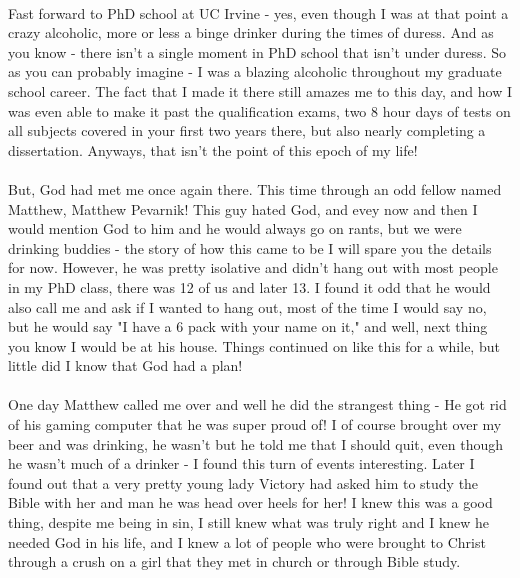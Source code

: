 \documentclass[a4paper]{article}
\begin{document}
\paragraph{}
Fast forward to PhD school at UC Irvine - yes, even though I was at that point a crazy alcoholic, more or
less a binge drinker during the times of duress. And as you know - there isn't a single moment in PhD
school that isn't under duress. So as you can probably imagine - I was a blazing alcoholic throughout my
graduate school career. The fact that I made it there still amazes me to this day, and how I was even able
to make it past the qualification exams, two 8 hour days of tests on all subjects covered in your first two
years there, but also nearly completing a dissertation. Anyways, that isn't the point of this epoch of my life!

\paragraph{}
But, God had met me once again there. This time through an odd fellow named Matthew, Matthew Pevarnik! This
guy hated God, and evey now and then I would mention God to him and he would always go on rants, but we were
drinking buddies - the story of how this came to be I will spare you the details for now. However, he was
pretty isolative and didn't hang out with most people in my PhD class, there was 12 of us and later 13. I
found it odd that he would also call me and ask if I wanted to hang out, most of the time I would say no,
but he would say "I have a 6 pack with your name on it," and well, next thing you know I would be at his
house. Things continued on like this for a while, but little did I know that God had a plan!

\paragraph{}
One day Matthew called me over and well he did the strangest thing - He got rid of his gaming computer that
he was super proud of! I of course brought over my beer and was drinking, he wasn't but he told me that I
should quit, even though he wasn't much of a drinker - I found this turn of events interesting. Later I
found out that a very pretty young lady Victory had asked him to study the Bible with her and man he was
head over heels for her! I knew this was a good thing, despite me being in sin, I still knew what was truly
right and I knew he needed God in his life, and I knew a lot of people who were brought to Christ through a
crush on a girl that they met in church or through Bible study.
\end{document}
